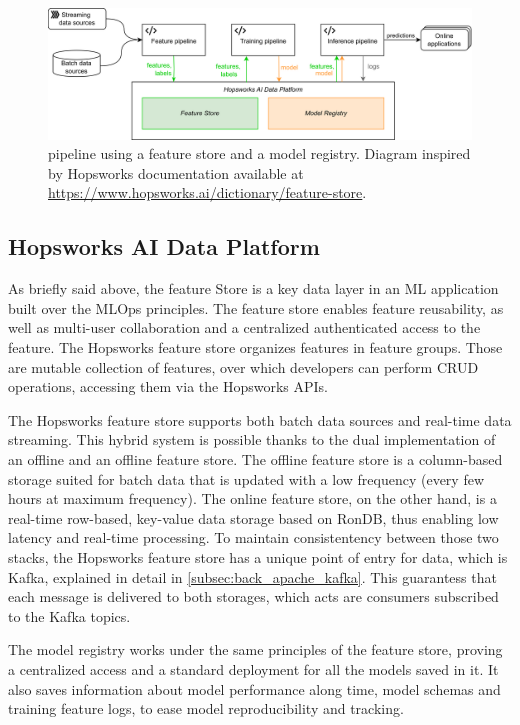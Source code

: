 \begin{figure}[!ht]
    \begin{center}
      \includegraphics[width=\textwidth]{figures/2-background_and_related_work/MLOps_hops.png}
    \end{center}
    \caption[Feature store in an MLOps pipeline]{ pipeline using a feature store and a model registry. Diagram inspired by Hopsworks documentation available at \url{https://www.hopsworks.ai/dictionary/feature-store}.}
    \label{fig:mlops_hops}
\end{figure}


\subsection{Hopsworks AI Data Platform}
\label{subsec:back_hopsworks_FS}
As briefly said above, the feature Store is a key data layer in an \gls{ML} application built over the \gls{MLOps} principles. The feature store enables feature reusability, as well as multi-user collaboration and a centralized authenticated access to the feature. The Hopsworks feature store organizes features in feature groups. Those are mutable collection of features, over which developers can perform \gls{CRUD} operations, accessing them via the Hopsworks \glspl{API}.

The Hopsworks feature store supports both batch data sources and real-time data streaming. This hybrid system is possible thanks to the dual implementation of an offline and an offline feature store. The offline feature store is a column-based storage suited for batch data that is updated with a low frequency (every few hours at maximum frequency). The online feature store, on the other hand, is a real-time row-based, key-value data storage based on RonDB, thus enabling low latency and real-time processing. To maintain consistentency between those two stacks, the Hopsworks feature store has a unique point of entry for data, which is Kafka, explained in detail in \ref{subsec:back_apache_kafka}. This guarantess that each message is delivered to both storages, which acts are consumers subscribed to the Kafka topics.

The model registry works under the same principles of the feature store, proving a centralized access and a standard deployment for all the models saved in it. It also saves information about model performance along time, model schemas and training feature logs, to ease model reproducibility and tracking.
